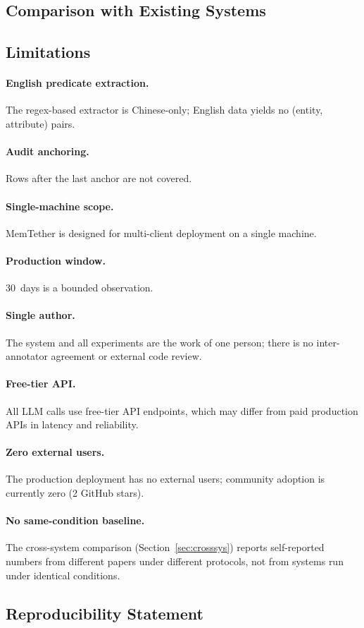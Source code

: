 \documentclass{article}
\begin{document}
\subsection{Comparison with Existing Systems}


\subsection{Limitations}
\paragraph{English predicate extraction.} The regex-based extractor is Chinese-only; English data yields no (entity, attribute) pairs.
\paragraph{Audit anchoring.} Rows after the last anchor are not covered.
\paragraph{Single-machine scope.} MemTether is designed for multi-client deployment on a single machine.
\paragraph{Production window.} 30~days is a bounded observation.



\paragraph{Single author.} The system and all experiments are the work of one person; there is no inter-annotator agreement or external code review.
\paragraph{Free-tier API.} All LLM calls use free-tier API endpoints, which may differ from paid production APIs in latency and reliability.
\paragraph{Zero external users.} The production deployment has no external users; community adoption is currently zero (2 GitHub stars).
\paragraph{No same-condition baseline.} The cross-system comparison (Section~\ref{sec:crosssys}) reports self-reported numbers from different papers under different protocols, not from systems run under identical conditions.\subsection*{Reproducibility Statement}
\end{document}
